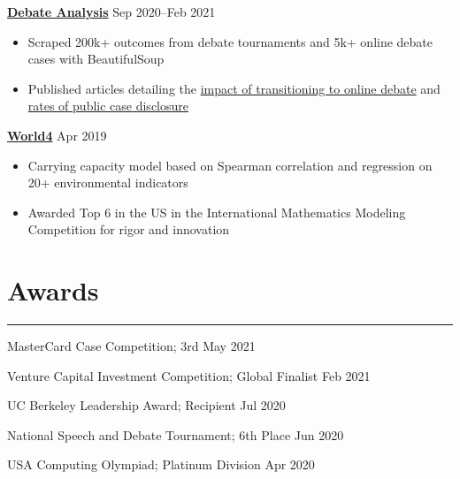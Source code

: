\documentclass[11pt]{article}
\newcommand{\resumesection}[1]{\vspace{-0.6cm}\section*{\color{highlight}#1}\vspace{-0.3cm}\hrule\vspace{0.2cm}}
\begin{document}
\textbf{\href{https://github.com/petezh/E-Debate}{Debate Analysis}} \hfill Sep 2020--Feb 2021\par
\begin{itemize}
	\item Scraped 200k+ outcomes from debate tournaments and 5k+ online debate cases with BeautifulSoup
	\item Published articles detailing the \href{https://www.vbriefly.com/2020/12/31/five-trends-among-e-debate-competitors-by-peter-zhang/}{impact of transitioning to online debate} and \href{https://www.vbriefly.com/2021/01/22/disclosure-in-numbers-by-peter-zhang/}{rates of public case disclosure}
\end{itemize}\vspace{0.1cm} \par

\textbf{\href{https://github.com/gautomdas/IMMC-World4/blob/master/US-9365.pdf}{World4}} \hfill Apr 2019\par
\begin{itemize}
	\item Carrying capacity model based on Spearman correlation and regression on 20+ environmental indicators
	\item Awarded Top 6 in the US in the International Mathematics Modeling Competition for rigor and innovation
\end{itemize}

\resumesection{Awards}

MasterCard Case Competition; 3rd \hfill May 2021 \par
Venture Capital Investment Competition; Global Finalist \hfill Feb 2021 \par
UC Berkeley Leadership Award; Recipient \hfill Jul 2020 \par
National Speech and Debate Tournament; 6th Place \hfill Jun 2020 \par
USA Computing Olympiad; Platinum Division \hfill Apr 2020 \par
\end{document}
